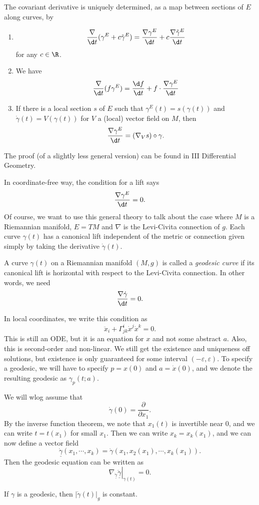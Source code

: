 \documentclass[a4paper]{article}
\begin{document}
\begin{prop}
  The covariant derivative is uniquely determined, as a map between sections of $E$ along curves, by
  \begin{enumerate}
    \item
      \[
        \frac{\nabla}{\d t}(\gamma^E + c \tilde{\gamma}^E) = \frac{\nabla \gamma^E}{\d t} + c \frac{\nabla \tilde{\gamma}^E}{\d t}
      \]
      for any $c \in \R$.
    \item We have
      \[
        \frac{\nabla}{\d t}(f \gamma^E) = \frac{\d f}{\d t} + f \cdot \frac{\nabla \gamma^E}{\d t}
      \]
    \item If there is a local section $s$ of $E$ such that $\gamma^E(t) = s(\gamma(t))$ and $\dot{\gamma}(t) = V(\gamma(t))$ for $V$ a (local) vector field on $M$, then
      \[
        \frac{\nabla \gamma^E}{\d t} = (\nabla_V s) \circ \gamma.
      \]
  \end{enumerate}
\end{prop}
The proof (of a slightly less general version) can be found in III Differential Geometry.

In coordinate-free way, the condition for a lift says
\[
  \frac{\nabla \gamma^E}{\d t} = 0.
\]
Of course, we want to use this general theory to talk about the case where $M$ is a Riemannian manifold, $E = TM$ and $\nabla$ is the Levi-Civita connection of $g$. Each curve $\gamma(t)$ has a canonical lift independent of the metric or connection given simply by taking the derivative $\dot{\gamma}(t)$.
\begin{defi}[Geodesic]
  A curve $\gamma(t)$ on a Riemannian manifold $(M, g)$ is called a \emph{geodesic curve} if its canonical lift is horizontal with respect to the Levi-Civita connection. In other words, we need
  \[
    \frac{\nabla \dot{\gamma}}{\d t} = 0.
  \]
\end{defi}
In local coordinates, we write this condition as
\[
  \ddot{x}_i + \Gamma^i_{jk}\dot{x}^j \dot{x}^k = 0.
\]
This is still an ODE, but it is an equation for $x$ and not some abstract $a$. Also, this is second-order and non-linear. We still get the existence and uniqueness off solutions, but existence is only guaranteed for some interval $(-\varepsilon, \varepsilon)$. To specify a geodesic, we will have to specify $p = x(0)$ and $a = \dot{x}(0)$, and we denote the resulting geodesic as $\gamma_p(t; a)$.

We will wlog assume that
\[
  \dot{\gamma}(0) = \frac{\partial}{\partial x_1}.
\]
By the inverse function theorem, we note that $x_1(t)$ is invertible near $0$, and we can write $t = t(x_1)$ for small $x_1$. Then we can write $x_k = x_k(x_1)$, and we can now define a vector field
\[
  \dot{\underline{\gamma}}(x_1, \cdots, x_k) = \dot{\gamma}(x_1, x_2(x_1), \cdots, x_k(x_1)).
\]
Then the geodesic equation can be written as
\[
  \left.\nabla_{\dot{\underline{\gamma}}} \dot{\underline{\gamma}}\right|_{\gamma(t)} = 0.
\]
\begin{prop}
  If $\gamma$ is a geodesic, then $|\dot{\gamma}(t)|_g$ is constant.
\end{prop}
\end{document}
